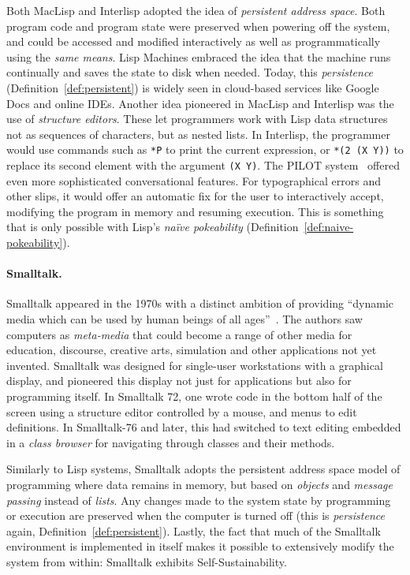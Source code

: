 \documentclass[ twoside,openright,titlepage,numbers=noenddot,headinclude,footinclude,cleardoublepage=empty,abstract=on,
                BCOR=5mm,paper=a4,fontsize=11pt
                ]{scrreprt}
\theoremstyle{definition}
\begin{document}
Both MacLisp and Interlisp adopted the idea of \emph{persistent address
space}. Both program code and program state were preserved when powering
off the system, and could be accessed and modified interactively as well
as programmatically using the \emph{same means}. Lisp Machines embraced
the idea that the machine runs continually and saves the state to disk
when needed. Today, this \emph{persistence}
(Definition~\ref{def:persistent}) is widely seen in cloud-based services
like Google Docs and online \acp{IDE}. Another idea pioneered in MacLisp
and Interlisp was the use of \emph{structure editors}. These let
programmers work with Lisp data structures not as sequences of
characters, but as nested lists. In Interlisp, the programmer would use
commands such as \texttt{*P} to print the current expression, or
\texttt{*(2\ (X\ Y))} to replace its second element with the argument
\texttt{(X\ Y)}. The PILOT system~\parencite{Pilot} offered even more
sophisticated conversational features. For typographical errors and
other slips, it would offer an automatic fix for the user to
interactively accept, modifying the program in memory and resuming
execution. This is something that is only possible with Lisp's
\emph{naïve pokeability} (Definition~\ref{def:naive-pokeability}).

\paragraph{Smalltalk.}

Smalltalk appeared in the 1970s with a distinct ambition of providing
``dynamic media which can be used by human beings of all
ages''~\parencite{PersonalDynMedia}. The authors saw computers as
\emph{meta-media} that could become a range of other media for
education, discourse, creative arts, simulation and other applications
not yet invented. Smalltalk was designed for single-user workstations
with a graphical display, and pioneered this display not just for
applications but also for programming itself. In Smalltalk 72, one wrote
code in the bottom half of the screen using a structure editor
controlled by a mouse, and menus to edit definitions. In Smalltalk-76
and later, this had switched to text editing embedded in a \emph{class
browser} for navigating through classes and their methods.

Similarly to Lisp systems, Smalltalk adopts the persistent address space
model of programming where data remains in memory, but based on
\emph{objects} and \emph{message passing} instead of \emph{lists}. Any
changes made to the system state by programming or execution are
preserved when the computer is turned off (this is \emph{persistence}
again, Definition~\ref{def:persistent}). Lastly, the fact that much of
the Smalltalk environment is implemented in itself makes it possible to
extensively modify the system from within: Smalltalk exhibits
Self-Sustainability.
\end{document}
